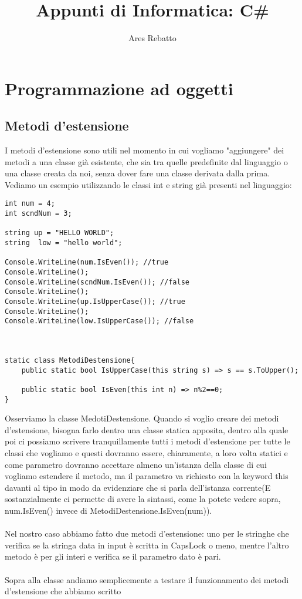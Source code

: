 \documentclass[]{article}
\title{Appunti di Informatica: C\#}
\author{Ares Rebatto}
\begin{document}
\maketitle 
\newpage
\tableofcontents
\newpage
\section{Programmazione ad oggetti} 
\subsection{Metodi d'estensione}
I metodi d'estensione sono utili nel momento in cui vogliamo "aggiungere" dei metodi a una classe già esistente, che 
sia tra quelle predefinite dal linguaggio o una classe creata da noi, senza dover fare una classe derivata dalla prima.
Vediamo un esempio utilizzando le classi int e string già presenti nel linguaggio:
\begin{verbatim}
int num = 4;
int scndNum = 3;

string up = "HELLO WORLD";
string  low = "hello world";

Console.WriteLine(num.IsEven()); //true
Console.WriteLine();
Console.WriteLine(scndNum.IsEven()); //false
Console.WriteLine();
Console.WriteLine(up.IsUpperCase()); //true
Console.WriteLine();
Console.WriteLine(low.IsUpperCase()); //false



static class MetodiDestensione{
	public static bool IsUpperCase(this string s) => s == s.ToUpper();
	
	public static bool IsEven(this int n) => n%2==0;
}
\end{verbatim}
Osserviamo la classe MedotiDestensione. Quando si voglio creare dei metodi d'estensione, bisogna farlo dentro una classe
statica apposita, dentro alla quale poi ci possiamo scrivere tranquillamente tutti i metodi d'estensione per tutte le 
classi che vogliamo e questi dovranno essere, chiaramente, a loro volta statici e come parametro dovranno accettare almeno un'istanza della classe di cui vogliamo estendere il metodo, ma il parametro va richiesto con la keyword this davanti al tipo in modo da evidenziare che si parla dell'istanza corrente(E sostanzialmente ci permette di avere la sintassi, come la potete vedere sopra, num.IsEven() invece di MetodiDestensione.IsEven(num)). \\ \\ 
Nel nostro caso abbiamo fatto due metodi d'estensione: uno per le stringhe che verifica se la stringa data in input
è scritta in CapsLock o meno, mentre l'altro metodo è per gli interi e verifica se il parametro dato è pari. \\ \\
Sopra alla classe andiamo semplicemente a testare il funzionamento dei metodi d'estensione che abbiamo scritto
\end{document}

